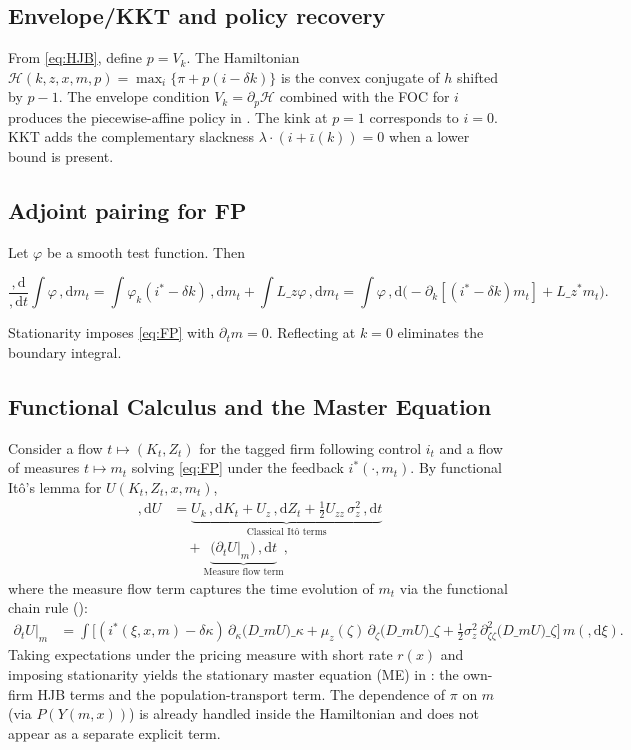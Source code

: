 ﻿\documentclass[11pt,letterpaper,oneside]{article}
\numberwithin{equation}{section}
\newcommand{\1}{\mathbf{1}}
\newcommand{\diff}{,\mathrm{d}}
\newcommand{\Lz}{L\_z}
\newcommand{\Lzadj}{L\_z^{\!*}}
\newcommand{\Dm}{D\_m}
\newcommand{\kbar}{\bar\iota}
\begin{document}
\begin{tcolorbox}[didacticstyle]
\begin{itemize}[leftmargin=1.1em,itemsep=0.25em]
\subsection{Envelope/KKT and policy recovery}
From \eqref{eq:HJB}, define $p=V_k$. The Hamiltonian
$\mathcal{H}(k,z,x,m,p)=\max_i\{\pi+p(i-\delta k)\}$
is the convex conjugate of $h$ shifted by $p-1$. The envelope condition $V_k=\partial_p \mathcal{H}$ combined with the FOC for $i$ produces the piecewise-affine policy in . The kink at $p=1$ corresponds to $i=0$. KKT adds the complementary slackness $\lambda\cdot(i+\kbar(k))=0$ when a lower bound is present.

\subsection{Adjoint pairing for FP}
Let $\varphi$ be a smooth test function. Then

$$
\frac{\diff}{\diff t}\int \varphi\,\diff m_t
= \int \varphi_k (i^*-\delta k)\,\diff m_t + \int \Lz \varphi\,\diff m_t
= \int \varphi\,\diff\Big(-\partial_k[(i^*-\delta k)m_t]+\Lzadj m_t\Big).
$$

Stationarity imposes \eqref{eq:FP} with $\partial_t m=0$. Reflecting at $k=0$ eliminates the boundary integral.

\subsection*{Functional Calculus and the Master Equation}\label{app:master-derivation}
Consider a flow $t\mapsto (K_t,Z_t)$ for the tagged firm following control $i_t$ and a flow of measures $t\mapsto m_t$ solving \eqref{eq:FP} under the feedback $i^*(\cdot,m_t)$. By functional Itô's lemma for $U(K_t,Z_t,x,m_t)$,
\begin{align*}
\diff U &= \underbrace{U_k\,\diff K_t + U_z\,\diff Z_t + \tfrac12 U_{zz}\,\sigma_z^2\,\diff t}_{\text{Classical Itô terms}} \\
        &\quad + \underbrace{\big(\partial_t U\big|_{m}\big)\,\diff t}_{\text{Measure flow term}},
\end{align*}
where the measure flow term captures the time evolution of $m_t$ via the functional chain rule ():
\begin{align*}
\partial_t U\big|_{m} &= \int \Big[ (i^*(\xi,x,m)-\delta\kappa)\,\partial_{\kappa}\big(\Dm U\big)\!\_\kappa
  +\mu_z(\zeta)\,\partial_{\zeta}\big(\Dm U\big)\!\_\zeta
  +\tfrac12\sigma_z^2\,\partial_{\zeta\zeta}^2\big(\Dm U\big)\!\_\zeta\Big] \, m(\diff \xi).
\end{align*}
Taking expectations under the pricing measure with short rate $r(x)$ and imposing stationarity yields the stationary master equation (ME) in : the own-firm HJB terms and the population-transport term. The dependence of $\pi$ on $m$ (via $P(Y(m,x))$) is already handled inside the Hamiltonian and does not appear as a separate explicit term.


\end{itemize}
\end{tcolorbox}
\end{document}
